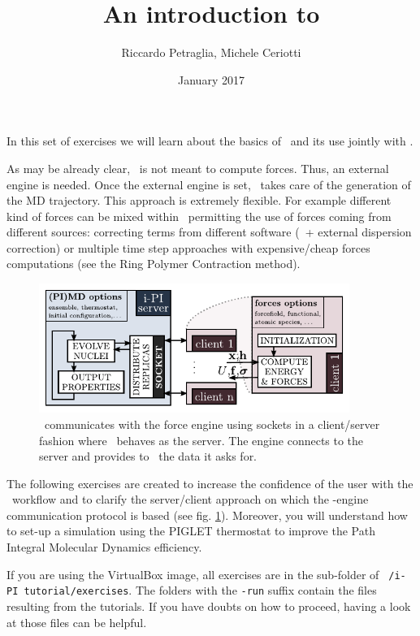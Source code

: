 \documentclass{article}
\title{An introduction to \ipi{}}
\author{Riccardo Petraglia, Michele Ceriotti}
\date{January 2017}
\begin{document}
\maketitle

In this set of exercises we will learn about the basics of \ipi\ and
its use jointly with \qe.

As may be already clear, \ipi\ is not meant to compute forces. Thus,
an external engine is needed. Once the external engine is set, \ipi\
takes care of the generation of the MD trajectory. This approach
is extremely flexible. For example different kind of forces can be
mixed within \ipi\ permitting the use of forces coming from different
sources: correcting terms from different software (\PWscf~+ external
dispersion correction) or multiple time step approaches with
expensive/cheap forces computations (see the Ring Polymer Contraction
method).

\begin{figure}[h!]
\centering
\includegraphics[width=0.9\textwidth]{ipi-scheme.pdf}
\caption{\ipi\ communicates with the force engine using sockets in a
  client/server fashion where \ipi\ behaves as the server. The engine
  connects to the server and provides to \ipi\ the data it asks
  for.}\label{fig:ipi-scheme}
\end{figure}


The following exercises are created to increase the confidence of the user
with the \ipi\ workflow and to clarify the server/client approach on
which the \ipi-engine communication protocol is based (see
fig. \ref{fig:ipi-scheme}). Moreover, you will understand how to
set-up a simulation using the PIGLET thermostat to improve the Path
Integral Molecular Dynamics efficiency.


If you are using the VirtualBox image, all exercises are in the
sub-folder of \texttt{~/i-PI tutorial/exercises}. The folders with the
\texttt{-run} suffix contain the files resulting from the
tutorials. If you have doubts on how to proceed, having a look at
those files can be helpful.
\end{document}
